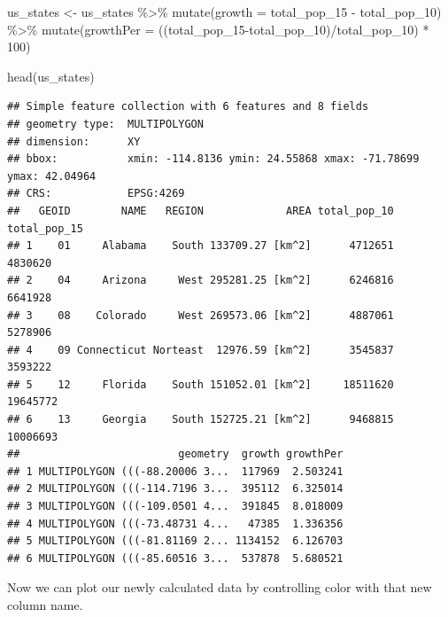 \documentclass[
]{book}
\newenvironment{Shaded}{\begin{snugshade}}{\end{snugshade}}
\newcommand{\AttributeTok}[1]{\textcolor[rgb]{0.77,0.63,0.00}{#1}}
\newcommand{\DecValTok}[1]{\textcolor[rgb]{0.00,0.00,0.81}{#1}}
\newcommand{\FunctionTok}[1]{\textcolor[rgb]{0.00,0.00,0.00}{#1}}
\newcommand{\NormalTok}[1]{#1}
\newcommand{\OtherTok}[1]{\textcolor[rgb]{0.56,0.35,0.01}{#1}}
\newcommand{\SpecialCharTok}[1]{\textcolor[rgb]{0.00,0.00,0.00}{#1}}
\begin{document}
\begin{Shaded}
\begin{Highlighting}[]
\NormalTok{us\_states }\OtherTok{\textless{}{-}}\NormalTok{ us\_states }\SpecialCharTok{\%\textgreater{}\%} 
  \FunctionTok{mutate}\NormalTok{(}\AttributeTok{growth =}\NormalTok{ total\_pop\_15 }\SpecialCharTok{{-}}\NormalTok{ total\_pop\_10) }\SpecialCharTok{\%\textgreater{}\%}
  \FunctionTok{mutate}\NormalTok{(}\AttributeTok{growthPer =}\NormalTok{ ((total\_pop\_15}\SpecialCharTok{{-}}\NormalTok{total\_pop\_10)}\SpecialCharTok{/}\NormalTok{total\_pop\_10) }\SpecialCharTok{*} \DecValTok{100}\NormalTok{)}

\FunctionTok{head}\NormalTok{(us\_states)}
\end{Highlighting}
\end{Shaded}

\begin{verbatim}
## Simple feature collection with 6 features and 8 fields
## geometry type:  MULTIPOLYGON
## dimension:      XY
## bbox:           xmin: -114.8136 ymin: 24.55868 xmax: -71.78699 ymax: 42.04964
## CRS:            EPSG:4269
##   GEOID        NAME   REGION             AREA total_pop_10 total_pop_15
## 1    01     Alabama    South 133709.27 [km^2]      4712651      4830620
## 2    04     Arizona     West 295281.25 [km^2]      6246816      6641928
## 3    08    Colorado     West 269573.06 [km^2]      4887061      5278906
## 4    09 Connecticut Norteast  12976.59 [km^2]      3545837      3593222
## 5    12     Florida    South 151052.01 [km^2]     18511620     19645772
## 6    13     Georgia    South 152725.21 [km^2]      9468815     10006693
##                         geometry  growth growthPer
## 1 MULTIPOLYGON (((-88.20006 3...  117969  2.503241
## 2 MULTIPOLYGON (((-114.7196 3...  395112  6.325014
## 3 MULTIPOLYGON (((-109.0501 4...  391845  8.018009
## 4 MULTIPOLYGON (((-73.48731 4...   47385  1.336356
## 5 MULTIPOLYGON (((-81.81169 2... 1134152  6.126703
## 6 MULTIPOLYGON (((-85.60516 3...  537878  5.680521
\end{verbatim}

Now we can plot our newly calculated data by controlling color with that new column name.
\end{document}
